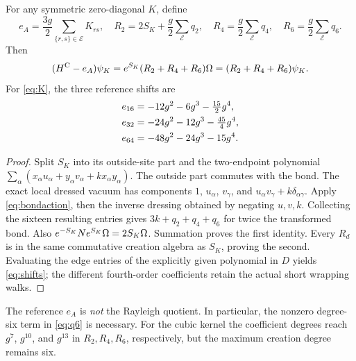 \begin{proposition}\label{prop:residual}
For any symmetric zero-diagonal $K$, define
\[
 e_A=\frac{3g}{2}\sum_{\{r,s\}\in\mathcal E}K_{rs},\quad
 R_2=2S_K+\frac g2\sum_{\mathcal E}q_2,\quad
 R_4=\frac g2\sum_{\mathcal E}q_4,\quad
 R_6=\frac g2\sum_{\mathcal E}q_6.
\]
Then
\begin{equation}\label{eq:residual}
 (H^{\rm C}-e_A)\psi_K
       =e^{S_K}(R_2+R_4+R_6)\Omega
       =(R_2+R_4+R_6)\psi_K.
\end{equation}
For \eqref{eq:K}, the three reference shifts are
\begin{align}\label{eq:shifts}
 e_{16}&=-12g^2-6g^3-\tfrac{15}{2}g^4,\notag\\
 e_{32}&=-24g^2-12g^3-\tfrac{45}{4}g^4,\\
 e_{64}&=-48g^2-24g^3-15g^4.\notag
\end{align}
\end{proposition}
\begin{proof}
Split $S_K$ into its outside-site part and the two-endpoint polynomial
$\sum_\alpha(x_\alpha u_\alpha+y_\alpha v_\alpha+kx_\alpha y_\alpha)$.
The outside part commutes with the bond. The exact local dressed vacuum has
components $1$, $u_\alpha$, $v_\gamma$, and
$u_\alpha v_\gamma+k\delta_{\alpha\gamma}$.
Apply \eqref{eq:bondaction}, then the inverse dressing obtained by negating
$u,v,k$. Collecting the sixteen resulting entries gives
$3k+q_2+q_4+q_6$ for twice the transformed bond. Also
$e^{-S_K}Ne^{S_K}\Omega=2S_K\Omega$.
Summation proves the first identity. Every $R_d$ is in the same commutative
creation algebra as $S_K$, proving the second. Evaluating the edge entries of
the explicitly given polynomial in $D$ yields \eqref{eq:shifts}; the different
fourth-order coefficients retain the actual short wrapping walks.
\end{proof}

The reference $e_A$ is \emph{not} the Rayleigh quotient. In particular, the
nonzero degree-six term in \eqref{eq:q6} is necessary. For the cubic kernel the
coefficient degrees reach $g^7$, $g^{10}$, and $g^{13}$ in $R_2,R_4,R_6$,
respectively, but the maximum creation degree remains six.
